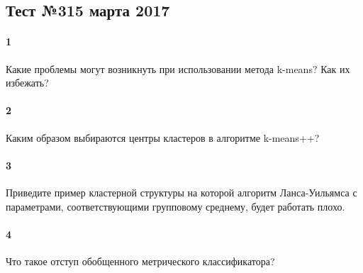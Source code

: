 \documentclass[a4paper,12pt]{article}
\begin{document}
  \subsection*{Тест №3\hfill{15 марта 2017}}

  \paragraph{1} Какие проблемы могут возникнуть при использовании метода k-means? Как их избежать?

  \makebox[\linewidth]{\hrulefill}
  \makebox[\linewidth]{\hrulefill}
  \makebox[\linewidth]{\hrulefill}
  \makebox[\linewidth]{\hrulefill}

	\paragraph{2} Каким образом выбираются центры кластеров в алгоритме k-means++?
	
  \makebox[\linewidth]{\hrulefill}
  \makebox[\linewidth]{\hrulefill}
  \makebox[\linewidth]{\hrulefill}
	
  \paragraph{3}  Приведите пример кластерной структуры на которой алгоритм
  Ланса-Уильямса с параметрами, соответствующими групповому среднему, будет
  работать плохо.

  \hspace{6em}
  
  \paragraph{4} Что такое отступ обобщенного метрического классификатора?

  \makebox[\linewidth]{\hrulefill}
  \makebox[\linewidth]{\hrulefill}
\end{document}
